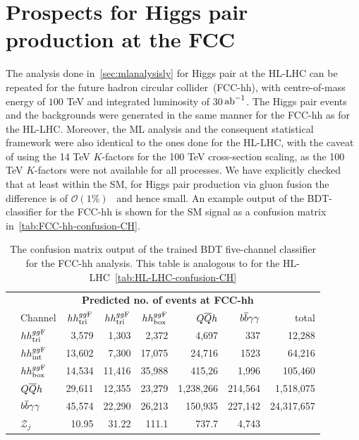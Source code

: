 \chapter{ Prospects for Higgs pair production at the FCC }\label{app:fcc}
The analysis done in~\autoref{sec:mlanalysisly} for Higgs pair at the HL-LHC can be repeated for the future hadron circular collider~(FCC-hh), with centre-of-mass energy of $100$ TeV and integrated luminosity of 30$\,{\rm ab}^{-1}$. The Higgs pair events and the backgrounds were generated in the same manner for the FCC-hh as for the HL-LHC. Moreover, the ML analysis  and the consequent statistical framework were also identical to the ones done for the HL-LHC, with the caveat of using the 14 TeV $K$-factors for the 100 TeV cross-section scaling, as the 100 TeV $K$-factors were not available for all processes. We have explicitly checked that at least within the SM, for Higgs pair production via gluon fusion the difference is of $\mathcal{O}(1\%)$~\cite{Maltoni:2014eza} and hence small. An example output of the BDT-classifier for the FCC-hh is shown for the SM signal as a confusion matrix in~\autoref{tab:FCC-hh-confusion-CH}.\\
 \begin{table}[]
 	\centering
 	{\footnotesize
 		\begin{tabular}{ll|rrrrr|r}
 			\multirow{7}{*}{\rb{\bf Actual no. of events\hspace{0.45cm}}} & \multicolumn{7}{c}{\bf Predicted no. of events at FCC-hh}\\
 			\cmidrule[\heavyrulewidth]{2-8}
 			& Channel & $hh^{gg\rm F}_{\rm tri}$ & $hh^{gg\rm F}_{\rm tri}$ &  $hh^{gg\rm F}_{\rm box}$&      $Q\overline Q h$ & $b\overline b\gamma\gamma$ &   total \\
 			\cline{2-8}
 			&$hh^{gg\rm F}_{\rm tri}$       &  	3,579& 1,303&	2,372&	4,697&	337&	12,288 \\
 			&$hh^{gg\rm F}_{\rm int}$       &  13,602& 7,300&	17,075&	24,716&	1523&	64,216 \\
 			&$hh^{gg\rm F}_{\rm box}$       &  14,534&	11,416&	35,988&	415,26& 1,996&	105,460 \\
 			&$Q\overline Q h$         & 29,611&	12,355&	23,279&	1,238,266&	214,564&	1,518,075 \\
 			&$b\overline b\gamma\gamma$        &  45,574&	22,290&	26,213&	150,935&	227,142&	24,317,657 \\
 			\cline{2-8}
 			&$\mathcal{Z}_j$&   	10.95&	31.22&	111.1&	737.7&	4,743&	 \\
 			\cmidrule[\heavyrulewidth]{2-8}
 		\end{tabular}
 	}
 		\caption{The confusion matrix output of the trained BDT  five-channel classifier for the FCC-hh analysis. This table is analogous to for the HL-LHC~\autoref{tab:HL-LHC-confusion-CH}}
 	\label{tab:FCC-hh-confusion-CH}
 \end{table}
